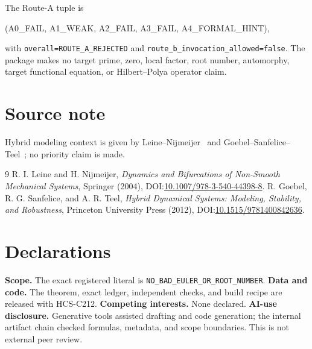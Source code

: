 \documentclass[11pt]{article}
\begin{document}
The Route-A tuple is
\begin{center}\small\ttfamily
(A0\_FAIL, A1\_WEAK, A2\_FAIL, A3\_FAIL, A4\_FORMAL\_HINT),
\end{center}
with \texttt{overall=ROUTE\_A\_REJECTED} and
\texttt{route\_b\_invocation\_allowed=false}.  The package makes no target
prime, zero, local factor, root number, automorphy, target functional equation,
or Hilbert--Polya operator claim.
\fi

\section*{Source note}
Hybrid modeling context is given by Leine--Nijmeijer~\cite{leine2004} and
Goebel--Sanfelice--Teel~\cite{goebel2012}; no priority claim is made.
\begin{thebibliography}{9}
 R. I. Leine and H. Nijmeijer, \emph{Dynamics and
Bifurcations of Non-Smooth Mechanical Systems}, Springer (2004),
DOI:\href{https://doi.org/10.1007/978-3-540-44398-8}{10.1007/978-3-540-44398-8}.
 R. Goebel, R. G. Sanfelice, and A. R. Teel,
\emph{Hybrid Dynamical Systems: Modeling, Stability, and Robustness},
Princeton University Press (2012),
DOI:\href{https://doi.org/10.1515/9781400842636}{10.1515/9781400842636}.
\end{thebibliography}

\section*{Declarations}
\textbf{Scope.} The exact registered literal is
\texttt{NO\_BAD\_EULER\_OR\_ROOT\_NUMBER}.
\textbf{Data and code.} The theorem, exact ledger, independent checks, and
build recipe are released with HCS-C212. \textbf{Competing interests.} None
declared. \textbf{AI-use disclosure.} Generative tools assisted drafting and
code generation; the internal artifact chain checked formulas, metadata, and
scope boundaries.  This is not external peer review.
\end{document}
